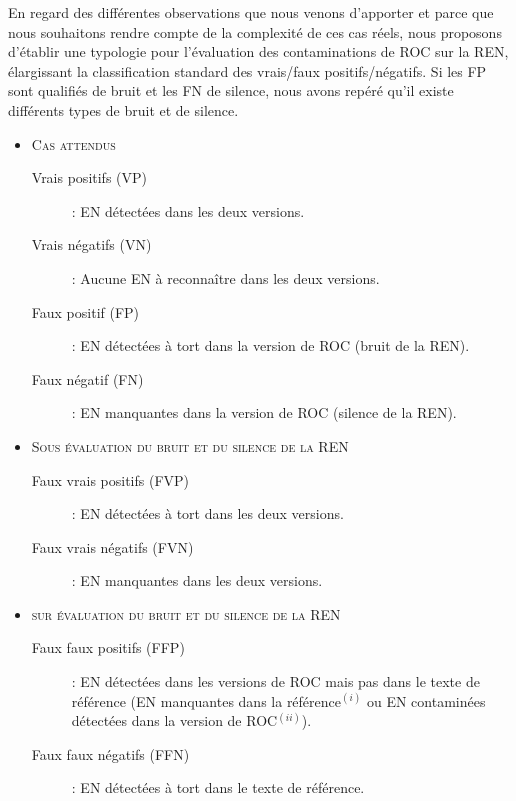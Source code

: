 En regard des différentes observations que nous venons d'apporter et parce que nous souhaitons rendre compte de la complexité de ces cas réels, nous proposons d'établir une typologie pour l'évaluation des contaminations de ROC sur la REN, élargissant la classification standard des vrais/faux positifs/négatifs. Si les FP sont qualifiés de bruit et les FN de silence, nous avons repéré qu'il existe différents types de bruit et de silence. %


\begin{itemize}


	\item[] \textsc{Cas attendus}
	
	
	\begin{description}

		\item[Vrais positifs (VP)]: EN détectées dans les deux versions.
		\item[Vrais négatifs (VN)]: Aucune EN à reconnaître dans les deux versions.
		\item[Faux positif (FP)]: EN détectées à tort dans la version de ROC (bruit de la REN).
		\item[Faux négatif (FN)]: EN manquantes dans la version de ROC (silence de la REN).
	\end{description}
	
		
	\item[] \textsc{Sous évaluation du bruit et du silence de la REN}
	
	
	\begin{description}
	
		\item[Faux vrais positifs (FVP)]: EN détectées à tort dans les deux versions.
	
	 	\item[Faux vrais négatifs (FVN)] : EN manquantes dans les deux versions.
	 \end{description}
	 
	 \item[] \textsc{sur évaluation du bruit et du silence de la REN}
	
	\begin{description}
	
		\item[Faux faux positifs (FFP)]: EN détectées dans les versions de ROC mais pas dans le texte de référence (EN manquantes dans la référence$^{(i)}$ ou EN contaminées détectées dans la version de ROC$^{(ii)}$).
		
 		\item[Faux faux négatifs (FFN)]: EN  détectées à tort dans le texte de référence.

	\end{description}

\end{itemize}

